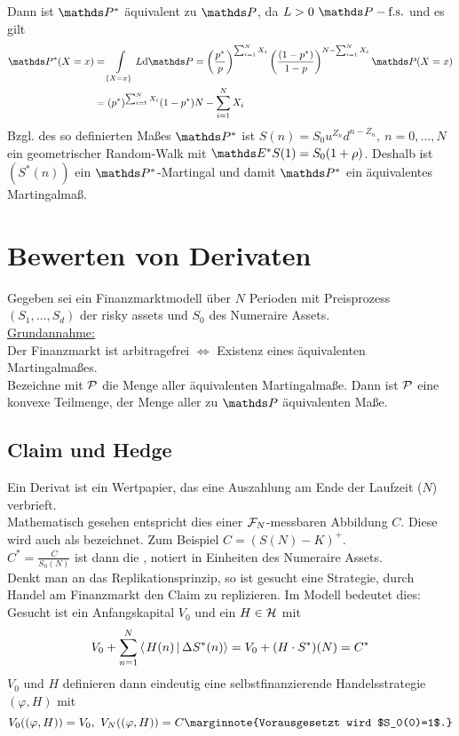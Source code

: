 \begin{enumerate}[(a)]
\[	\]
	Dann ist $\Pw^*$ äquivalent zu $\Pw$, da $L>0~\Pfs$ und es gilt
	\begin{equation*}
	\begin{aligned}
		\Pw^*(X=x) &= \int\limits_{\{X=x\}}L\dint \Pw=\enbrace{\frac{p^*}{p}}^{\sum_{i=1}^{N}X_i}\enbrace{\frac{(1-p^*)}{1-p}}^{N-\sum_{i=1}^{N}X_i} \Pw(X=x)\\
		&= (p^*)^{\sum_{i=1}^{N}X_i}(1-p^*){N-\sum_{i=1}^{N}X_i}
	\end{aligned}
	\end{equation*}
	Bzgl. des so definierten Maßes $\Pw^*$ ist $S(n)=S_0u^{Z_n}d^{n-Z_n},~n=0,\dots,N$ ein geometrischer Random-Walk mit $\E^*S(1)=S_0(1+\rho)$.
	Deshalb ist $(S^*(n))$ ein $\Pw^*$-Martingal und damit $\Pw^*$ ein äquivalentes Martingalmaß.
\end{enumerate}


\section{Bewerten von Derivaten}
\label{sec:bewerten_derivate}
Gegeben sei ein Finanzmarktmodell über $N$ Perioden mit Preisprozess $(S_1,\dots,S_d)$ der risky assets und $S_0$ des Numeraire Assets.\\

\uline{Grundannahme:}\\
Der Finanzmarkt ist arbitragefrei $\Leftrightarrow$ Existenz eines äquivalenten Martingalmaßes.\\
Bezeichne mit $\mathcal{P}$ die Menge aller äquivalenten Martingalmaße.
Dann ist $\mathcal{P}$ eine konvexe Teilmenge, der Menge aller zu $\Pw$ äquivalenten Maße.

\subsection{Claim und Hedge}
\label{sub:claim_hedge}
Ein Derivat ist ein Wertpapier, das eine Auszahlung am Ende der Laufzeit ($N$) verbrieft.\\
Mathematisch gesehen entspricht dies einer $\mathcal{F}_N$-messbaren Abbildung $C$.
Diese wird auch als  bezeichnet.
Zum Beispiel $C=(S(N)-K)^+$.\\
$C^*=\frac{C}{S_0(N)}$ ist dann die , notiert in Einheiten des Numeraire Assets.\\
Denkt man an das Replikationsprinzip, so ist gesucht eine Strategie, durch Handel am Finanzmarkt den Claim zu replizieren.
Im Modell bedeutet dies:\\
Gesucht ist ein Anfangskapital $V_0$ und ein $H\in \mathcal{H}$ mit 
\[
V_0+\sum_{n=1}^{N}\sprod{H(n)}{\Delta S^*(n)}=V_0+(H\cdot S^*)(N)=C^*
\]
$V_0$ und $H$ definieren dann eindeutig eine selbstfinanzierende Handelsstrategie $(\varphi,H)$ mit
\[
V_0((\varphi,H))=V_0,~ V_N((\varphi,H))=C\marginnote{Vorausgesetzt wird $S_0(0)=1$.}
\]

